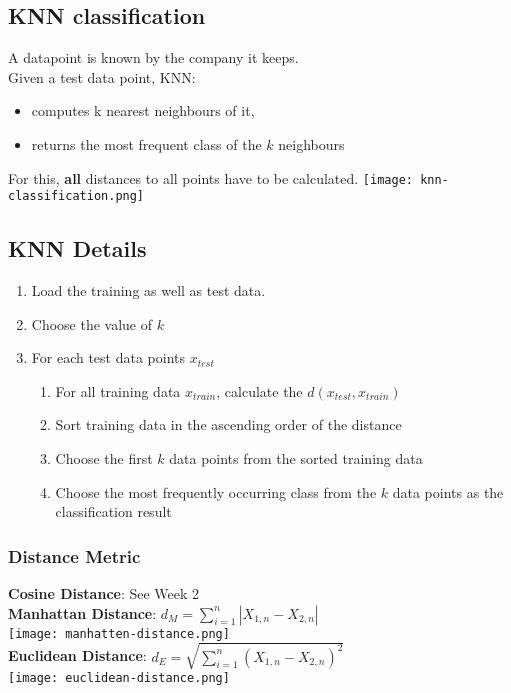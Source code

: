 \subsection{KNN classification}
A datapoint is known by the company it keeps.\\
Given a test data point, KNN:
\begin{itemize}
  \item computes k nearest neighbours of it,
  \item returns the most frequent class of the $k$ neighbours
\end{itemize}
For this, \textbf{all} distances to all points have to be calculated.
\texttt{[image: knn-classification.png]}

\subsection{KNN Details}
\begin{enumerate}
  \item Load the training as well as test data.
  \item Choose the value of $k$
  \item For each test data points $x_{test}$
  \begin{enumerate}
    \item For all training data $x_{train}$, calculate the $d(x_{test},x_{train})$
    \item Sort training data in the ascending order of the distance
    \item Choose the first $k$ data points from the sorted training data
    \item Choose the most frequently occurring class from the $k$ data points as the classification result
  \end{enumerate}
\end{enumerate}

\subsubsection{Distance Metric}
\textbf{Cosine Distance}: See Week 2\\
\textbf{Manhattan Distance}: $d_M = \displaystyle\sum_{i = 1}^{n}|X_{1,n} - X_{2,n}|$\\
\texttt{[image: manhatten-distance.png]}\\
\textbf{Euclidean Distance}: $d_E = \sqrt{\displaystyle\sum_{i = 1}^{n}(X_{1,n} - X_{2,n})^2}$\\
\texttt{[image: euclidean-distance.png]}\\
